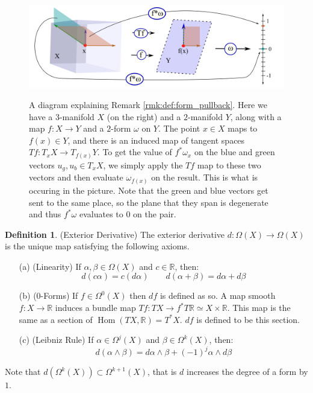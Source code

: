 \documentclass[12pt]{article}
\theoremstyle{definition}
\newtheorem{definition}[theorem]{Definition}
\numberwithin{equation}{section}
\newcommand{\R}{{\mathbb R}}
\newcommand{\op}{\operatorname}
\begin{document}
\begin{figure}[h]
    \centering
    \includegraphics[width=1\textwidth]{reu_figures/pullback_of_form.png}
    \label{fig:form_pullback}
    \caption{A diagram explaining Remark \ref{rmk:def:form_pullback}. Here we have a 3-manifold $X$ (on the right) and a $2$-manifold $Y$, along with a map $f:X \to Y$ and a $2$-form $\omega$ on $Y$. The point $x \in X$ maps to $f(x) \in Y$, and there is an induced map of tangent spaces $Tf:T_xX \to T_{f(x)}Y$. To get the value of $f^*\omega_x$ on the blue and green vectors $u_g,u_b \in T_xX$, we simply apply the $Tf$ map to these two vectors and then evaluate $\omega_{f(x)}$ on the result. This is what is occuring in the picture. Note that the green and blue vectors get sent to the same place, so the plane that they span is degenerate and thus $f^*\omega$ evaluates to $0$ on the pair.}
\end{figure}

\begin{definition} \label{def:exterior_derivative} (Exterior Derivative) The exterior derivative $d:\Omega(X) \to \Omega(X)$ is the unique map satisfying the following axioms.
\begin{itemize}
	\item[(a)] (Linearity) If $\alpha,\beta \in \Omega(X)$ and $c \in \R$, then:
	\[d(c\alpha) = c(d\alpha) \qquad d(\alpha + \beta) = d\alpha + d\beta\]
	\item[(b)] (0-Forms) If $f \in \Omega^0(X)$ then $df$ is defined as so. A map smooth $f:X \to \R$ induces a bundle map $Tf:TX \to f^*T\R \simeq X \times \R$. This map is the same as a section of $\op{Hom}(TX,\R) = T^*X$. $df$ is defined to be this section.
	\item[(c)] (Leibniz Rule) If $\alpha \in \Omega^j(X)$ and $\beta \in \Omega^k(X)$, then:
	\[d(\alpha \wedge \beta) = d\alpha \wedge \beta + (-1)^j \alpha \wedge d\beta\]
\end{itemize}
Note that $d(\Omega^k(X)) \subset \Omega^{k+1}(X)$, that is $d$ increases the degree of a form by $1$.
\end{definition}
\end{document}
